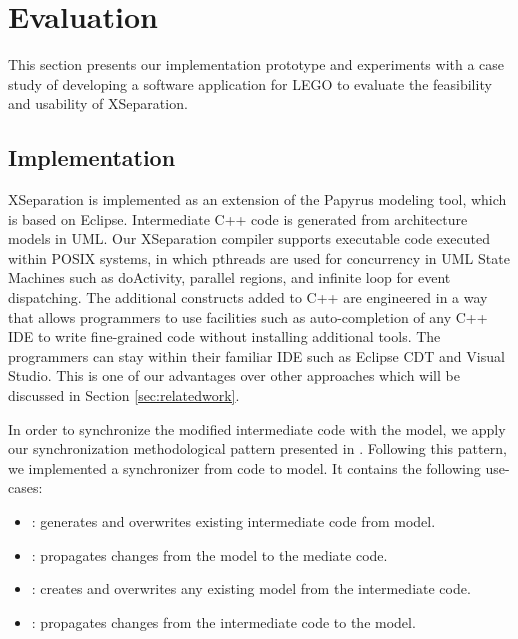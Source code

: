 \section{Evaluation}
\label{sec:evaluation}
This section presents our implementation prototype and experiments with a case study of developing a software application for LEGO to evaluate the feasibility and usability of XSeparation.

\subsection{Implementation}
XSeparation is implemented as an extension of the Papyrus modeling tool, which is based on Eclipse.
Intermediate C++ code is generated from architecture models in UML.
Our XSeparation compiler supports executable code executed within POSIX systems, in which pthreads are used for concurrency in UML State Machines such as doActivity, parallel regions, and infinite loop for event dispatching.
The additional constructs added to C++ are engineered in a way that allows programmers to use facilities such as auto-completion of any C++ IDE to write fine-grained code without installing additional tools.
The programmers can stay within their familiar IDE such as Eclipse CDT and Visual Studio.
This is one of our advantages over other approaches which will be discussed in Section \ref{sec:relatedwork}. 

In order to synchronize the modified intermediate code with the model, we apply our synchronization methodological pattern presented in \cite{foster2016}.
Following this pattern, we implemented a synchronizer from code to model.
It contains the following use-cases:

\begin{itemize}[\footnotesize]
	\itemsep0em
	\item {}: generates and overwrites existing intermediate code from model.
	\item {}: propagates changes from the model to the mediate code.
	\item {}: creates and overwrites any existing model from the intermediate code.
	\item {}: propagates changes from the intermediate code to the model.
\end{itemize}



